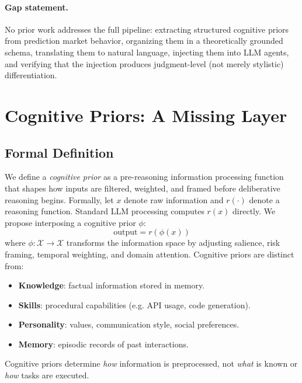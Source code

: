 \documentclass[11pt]{article}
\newcommand{\eg}{e.g.}
\begin{document}
\paragraph{Gap statement.} No prior work addresses the full pipeline: extracting structured cognitive priors from prediction market behavior, organizing them in a theoretically grounded schema, translating them to natural language, injecting them into LLM agents, and verifying that the injection produces judgment-level (not merely stylistic) differentiation.


\section{Cognitive Priors: A Missing Layer}
\label{sec:priors}

\subsection{Formal Definition}

We define a \emph{cognitive prior} as a pre-reasoning information processing function that shapes how inputs are filtered, weighted, and framed before deliberative reasoning begins. Formally, let $x$ denote raw information and $r(\cdot)$ denote a reasoning function. Standard LLM processing computes $r(x)$ directly. We propose interposing a cognitive prior $\phi$:
\begin{equation}
    \text{output} = r(\phi(x))
\end{equation}
where $\phi: \mathcal{X} \to \mathcal{X}$ transforms the information space by adjusting salience, risk framing, temporal weighting, and domain attention. Cognitive priors are distinct from:
\begin{itemize}[leftmargin=*,itemsep=1pt]
    \item \textbf{Knowledge}: factual information stored in memory.
    \item \textbf{Skills}: procedural capabilities (\eg{} API usage, code generation).
    \item \textbf{Personality}: values, communication style, social preferences.
    \item \textbf{Memory}: episodic records of past interactions.
\end{itemize}
Cognitive priors determine \emph{how} information is preprocessed, not \emph{what} is known or \emph{how} tasks are executed.
\end{document}
